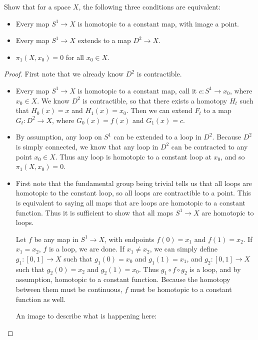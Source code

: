 \documentclass[12pt]{article}
\newenvironment{statement}[2][Statement]{\begin{trivlist}
\item[\hskip \labelsep {\bfseries #1}\hskip \labelsep {\bfseries #2.}]}{\end{trivlist}}
\begin{document}
\begin{statement}[Problem]{4}
  Show that for a space $X$, the following three conditions are equivalent:
  \begin{itemize}
    \item[(a)] Every map $S^1 \to X$ is homotopic to a constant map, with image a point. 
    \item[(b)] Every map $S^1 \to X$ extends to a map $D^2 \to X$. 
    \item[(c)] $\pi_1(X,x_0) = 0$ for all $x_0 \in X$. 
  \end{itemize}
\end{statement}
\begin{proof}
  First note that we already know $D^2$ is contractible.
  \begin{itemize}
    \item[$(a) \implies (b)$] Every map $S^1 \to X$ is homotopic to a constant map, call it $c:S^1 \to x_0$, where $x_0 \in X$. 
      We know $D^2$ is contractible, so that there exists a homotopy $H_t$ such that $H_0(x) = x$ and $H_1(x)=x_0$.
      Then we can extend $F_t$ to a map $G_t: D^2 \to X$, where $G_0(x)=f(x)$ and $G_1(x)=c$. 
    \item[$(b) \implies (c)$] By assumption, any loop on $S^1$ can be extended to a loop in $D^2$. Because $D^2$ is simply connected, 
      we know that any loop in $D^2$ can be contracted to any point $x_0 \in X$. Thus any loop is homotopic to a constant loop at $x_0$, 
      and so $\pi_1(X, x_0) = 0$. 
    \item[$(a) \implies (c)$] First note that the fundamental group being trivial tells us that all loops are homotopic to the constant loop,
      so all loops are contractible to a point. This is equivalent to saying all maps that are loops are homotopic to a constant function. 
      Thus it is sufficient to show that all maps $S^1 \to X$ are homotopic to loops. 
      \par Let $f$ be any map in $S^1 \to X$, with endpoints $f(0)=x_1$ and $f(1)=x_2$. If $x_1=x_2$, $f$ is a loop, we are done.
      If $x_1 \neq x_2$, we can simply define $g_1: [0,1] \to X$ such that $g_1(0) = x_0$ and $g_1(1)=x_1$, and 
      $g_2: [0,1] \to X$ such that $g_2(0) = x_2$ and $g_2(1)=x_0$. Thus $g_1 \circ f \circ g_2$ is a loop, and by assumption, homotopic to a constant function. 
      Because the homotopy between them must be continuous, $f$ must be homotopic to a constant function as well. 
      \par An image to describe what is happening here:

\end{itemize}
\end{proof}
\end{document}
